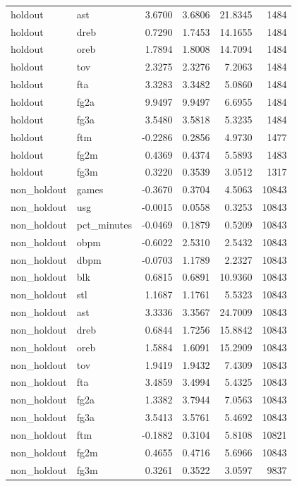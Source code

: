\begin{table}
\begin{tabular}{llrrrr}
holdout & ast & 3.6700 & 3.6806 & 21.8345 & 1484 \\
holdout & dreb & 0.7290 & 1.7453 & 14.1655 & 1484 \\
holdout & oreb & 1.7894 & 1.8008 & 14.7094 & 1484 \\
holdout & tov & 2.3275 & 2.3276 & 7.2063 & 1484 \\
holdout & fta & 3.3283 & 3.3482 & 5.0860 & 1484 \\
holdout & fg2a & 9.9497 & 9.9497 & 6.6955 & 1484 \\
holdout & fg3a & 3.5480 & 3.5818 & 5.3235 & 1484 \\
holdout & ftm & -0.2286 & 0.2856 & 4.9730 & 1477 \\
holdout & fg2m & 0.4369 & 0.4374 & 5.5893 & 1483 \\
holdout & fg3m & 0.3220 & 0.3539 & 3.0512 & 1317 \\
non\_holdout & games & -0.3670 & 0.3704 & 4.5063 & 10843 \\
non\_holdout & usg & -0.0015 & 0.0558 & 0.3253 & 10843 \\
non\_holdout & pct\_minutes & -0.0469 & 0.1879 & 0.5209 & 10843 \\
non\_holdout & obpm & -0.6022 & 2.5310 & 2.5432 & 10843 \\
non\_holdout & dbpm & -0.0703 & 1.1789 & 2.2327 & 10843 \\
non\_holdout & blk & 0.6815 & 0.6891 & 10.9360 & 10843 \\
non\_holdout & stl & 1.1687 & 1.1761 & 5.5323 & 10843 \\
non\_holdout & ast & 3.3336 & 3.3567 & 24.7009 & 10843 \\
non\_holdout & dreb & 0.6844 & 1.7256 & 15.8842 & 10843 \\
non\_holdout & oreb & 1.5884 & 1.6091 & 15.2909 & 10843 \\
non\_holdout & tov & 1.9419 & 1.9432 & 7.4309 & 10843 \\
non\_holdout & fta & 3.4859 & 3.4994 & 5.4325 & 10843 \\
non\_holdout & fg2a & 1.3382 & 3.7944 & 7.0563 & 10843 \\
non\_holdout & fg3a & 3.5413 & 3.5761 & 5.4692 & 10843 \\
non\_holdout & ftm & -0.1882 & 0.3104 & 5.8108 & 10821 \\
non\_holdout & fg2m & 0.4655 & 0.4716 & 5.6966 & 10843 \\
non\_holdout & fg3m & 0.3261 & 0.3522 & 3.0597 & 9837 \\
\bottomrule
\end{tabular}
\end{table}
